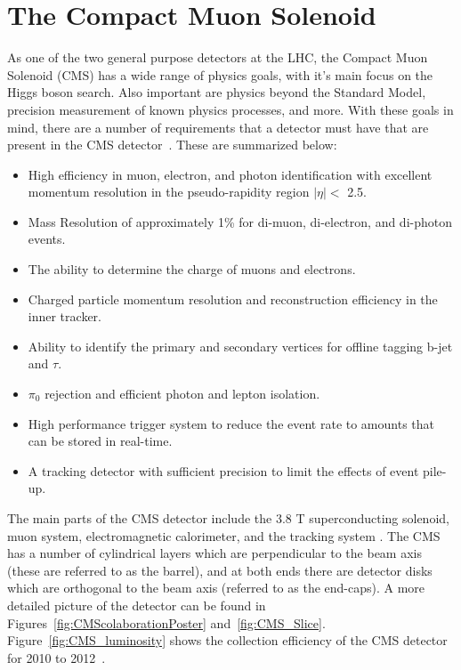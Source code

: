 

\section{The Compact Muon Solenoid}

As one of the two general purpose detectors at the LHC, the Compact Muon Solenoid (CMS) has a wide range of physics goals, with it's main focus on the Higgs boson search. Also important are physics beyond the Standard Model, precision measurement of known physics processes, and more.  With these goals in mind, there are a number of requirements that a detector must have that are present in the CMS detector~\cite{Bayatian:922757}. These are summarized below:

\begin{itemize}
 \item
   High efficiency in muon, electron, and photon identification with excellent momentum resolution in the pseudo-rapidity region $|\eta| <$ 2.5.
 \item 
   Mass Resolution of approximately 1\% for di-muon, di-electron, and di-photon events.
 \item 
   The ability to determine the charge of muons and electrons.
 \item
   Charged particle momentum resolution and reconstruction efficiency in the inner tracker. 
 \item
   Ability to identify the primary and secondary vertices for offline tagging b-jet and $\tau$.
 \item
  $\pi_0$ rejection and efficient photon and lepton isolation.
 \item
   High performance trigger system to reduce the event rate to amounts that can be stored in real-time.
 \item
   A tracking detector with sufficient precision to limit the effects of event pile-up.
\end{itemize}


  The main parts of the CMS detector include the 3.8 T superconducting solenoid, muon system, electromagnetic calorimeter, and the tracking system \cite{CMSExperiment}.  The CMS has a number of cylindrical layers which are perpendicular to the beam axis (these are referred to as the barrel), and at both ends there are detector disks which are orthogonal to the beam axis (referred to as the end-caps). A more detailed picture of the detector can be found in Figures~\ref{fig:CMScolaborationPoster} and~\ref{fig:CMS_Slice}.  Figure~\ref{fig:CMS_luminosity} shows the collection efficiency of the CMS detector for 2010 to 2012~\cite{cms_lumi_plots}.



